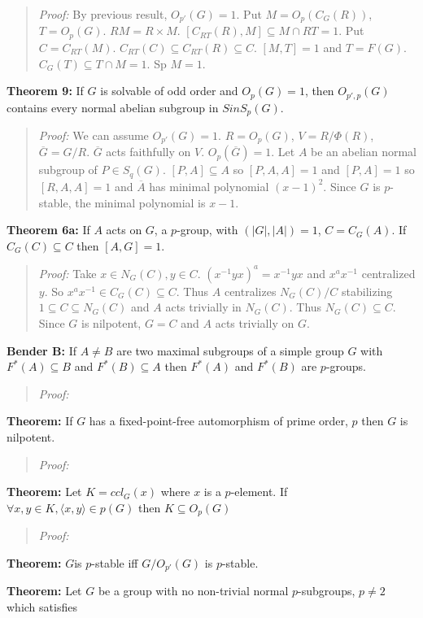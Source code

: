 \begin{quote}
\emph{Proof:}  By previous result, $O_{p'}(G)=1$.  Put $M=O_p(C_G(R))$, $T= O_p(G)$.  $RM= R \times M$.
$[C_{RT}(R), M] \subseteq M \cap RT = 1$.  Put $C=C_{RT}(M)$.  $C_{RT}(C) \subseteq C_{RT}(R) \subseteq C$.
$[M, T]=1$ and $T= F(G)$.  $C_G(T) \subseteq T \cap M =1$.  Sp $M = 1$.
\end{quote}
{\bf Theorem 9:} If $G$ is solvable of odd order and $O_{p}(G)=1$, then $O_{p', p}(G)$ contains every
normal abelian subgroup in $S in S_p(G)$.
\begin{quote}
\emph{Proof:}
We can assume $O_{p'}(G)=1$. $R= O_p(G)$, $V= R/\Phi(R)$, ${\overline G}= G/R$.
${\overline G}$ acts faithfully on $V$. $O_p({\overline G}) =1$.  Let $A$ be an abelian
normal subgroup of $P \in S_q(G)$. $[P, A] \subseteq A$ so $[P, A, A] = 1$ and $[P, A] =1$
so $[R,A,A]=1$ and ${\overline A}$ has minimal polynomial $(x-1)^2$.  Since $G$ is $p$-stable,
the minimal polynomial is $x-1$.
\end{quote}
{\bf Theorem 6a:} If $A$ acts on $G$, a $p$-group, with $(|G|, |A|)=1$, $C=C_G(A)$.
If $C_G(C) \subseteq C$ then $[A, G]=1$.
\begin{quote}
\emph{Proof:}
Take $x \in N_G(C), y \in C$.  $(x^{-1}yx)^a = x^{-1}yx$ and $x^ax^{-1}$ centralized $y$. 
So $x^ax^{-1} \in C_G(C) \subseteq C$.  Thus $A$ centralizes $N_G(C)/C$ stabilizing
$1 \subseteq C \subseteq N_G(C)$ and $A$ acts trivially in $N_G(C)$.  Thus $N_G(C) \subseteq C$.
Since $G$ is nilpotent, $G=C$ and $A$ acts trivially on $G$.
\end{quote}
{\bf Bender B:} If $A \ne B$ are two maximal subgroups of a simple group $G$ with
$F^*(A) \subseteq B$ and $F^*(B) \subseteq A$ then
$F^*(A)$ and $F^*(B)$ are $p$-groups.
\begin{quote}
\emph{Proof:}
\end{quote}
{\bf Theorem:} If $G$ has a fixed-point-free automorphism of prime order, $p$ then $G$ is nilpotent.
\begin{quote}
\emph{Proof:}
\end{quote}
{\bf Theorem:} Let $K=ccl_G(x)$ where $x$ is a $p$-element.  If $\forall x, y \in K, \langle x , y \rangle \in p(G)$
then $K \subseteq O_p(G)$
\begin{quote}
\emph{Proof:}
\end{quote}
{\bf Theorem:} $G$is $p$-stable iff $G/O_{p'}(G)$ is $p$-stable.
\begin{quote}
\end{quote}
{\bf Theorem:} Let $G$ be a group with no non-trivial normal $p$-subgroups, $p \ne 2$ which satisfies
